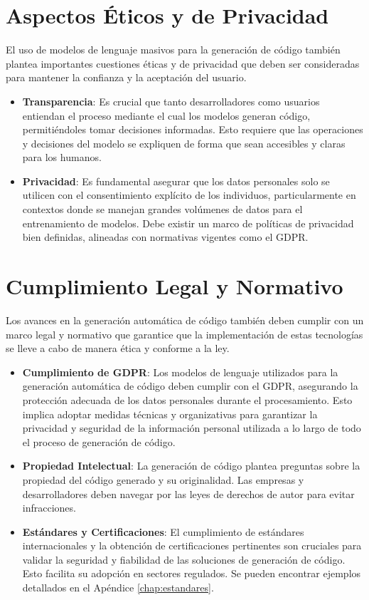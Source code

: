 \section{Aspectos Éticos y de Privacidad}

El uso de modelos de lenguaje masivos para la generación de código también plantea importantes cuestiones éticas y de privacidad que deben ser consideradas para mantener la confianza y la aceptación del usuario.

\begin{itemize}
    \item \textbf{Transparencia}: Es crucial que tanto desarrolladores como usuarios entiendan el proceso mediante el cual los modelos generan código, permitiéndoles tomar decisiones informadas. Esto requiere que las operaciones y decisiones del modelo se expliquen de forma que sean accesibles y claras para los humanos.

    \item \textbf{Privacidad}: Es fundamental asegurar que los datos personales solo se utilicen con el consentimiento explícito de los individuos, particularmente en contextos donde se manejan grandes volúmenes de datos para el entrenamiento de modelos. Debe existir un marco de políticas de privacidad bien definidas, alineadas con normativas vigentes como el \acrshort{GDPR}\cite{GDPR2023}.
\end{itemize}


\section{Cumplimiento Legal y Normativo}

Los avances en la generación automática de código también deben cumplir con un marco legal y normativo que garantice que la implementación de estas tecnologías se lleve a cabo de manera ética y conforme a la ley.

\begin{itemize}
    \item \textbf{Cumplimiento de \acrshort{GDPR}}: Los modelos de lenguaje utilizados para la generación automática de código deben cumplir con el \acrshort{GDPR}, asegurando la protección adecuada de los datos personales durante el procesamiento. Esto implica adoptar medidas técnicas y organizativas para garantizar la privacidad y seguridad de la información personal utilizada a lo largo de todo el proceso de generación de código.
    
    \item \textbf{Propiedad Intelectual}: La generación de código plantea preguntas sobre la propiedad del código generado y su originalidad. Las empresas y desarrolladores deben navegar por las leyes de derechos de autor para evitar infracciones.
    
    \item \textbf{Estándares y Certificaciones}: El cumplimiento de estándares internacionales y la obtención de certificaciones pertinentes son cruciales para validar la seguridad y fiabilidad de las soluciones de generación de código. Esto facilita su adopción en sectores regulados. Se pueden encontrar ejemplos detallados en el Apéndice \ref{chap:estandares}.

\end{itemize}